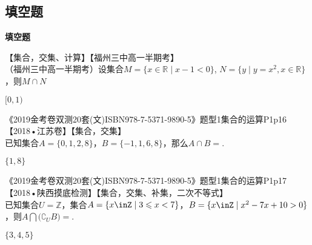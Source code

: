   \subsection{填空题}
  \begin{exercise}{\bf 填空题}
    \item 【集合，交集、计算】【福州三中高一半期考】\\
      （福州三中高一半期考）设集合$M=\{x\in \mathbb{R}\mid x-1<0 \} $, $N=\{y\mid y=x^2,x\in\mathbb{R} \} $，则$M\cap N$\tk
      \begin{answer}
        $[0,1)$
      \end{answer}
    \item 《2019金考卷双测20套(文)ISBN978-7-5371-9890-5》题型1集合的运算P1p16【2018•江苏卷】【集合，交集】\\
      已知集合$A=\{0,1,2,8\}$，$B=\{-1,1,6,8\}$，那么$A\cap B=$\tk.
      \begin{answer}
        $\{1,8\}$
      \end{answer}
    \item 《2019金考卷双测20套(文)ISBN978-7-5371-9890-5》题型1集合的运算P1p17【2018•陕西摸底检测】【集合，交集、补集，二次不等式】\\
      已知集合$U=\mathbb{Z}$，集合$A=\{x\inZ\mid 3\leqslant x<7\}$，$B=\{x\inZ\mid x^2-7x+10>0\}$，则$A\bigcap\bigl(\complement_UB\bigr)=$\tk.
      \begin{answer}
        $\{3,4,5\}$
      \end{answer}
  \end{exercise}

